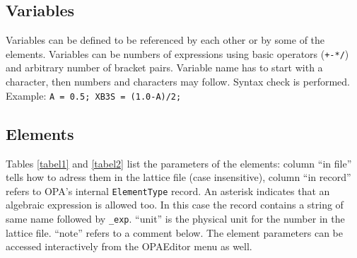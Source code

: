 \documentclass[12pt]{article}
\newcommand\code[1]{{\tt #1}}
\begin{document}
\subsection{\label{ssecvar}Variables}
Variables can be defined to be referenced by each other or by some of the elements.
Variables can be numbers of expressions using basic operators ({\tt +-*/}) and arbitrary number of bracket pairs. Variable name has to start with a character, then numbers and characters may follow. Syntax check is performed. Example: {\tt A = 0.5; XB3S = (1.0-A)/2; }\\

\subsection{\label{ssecelem}Elements}

Tables \ref{tabel1} and \ref{tabel2} list the parameters of the elements: column ``in file'' tells how to adress them in the lattice file (case insensitive), column ``in record'' refers to OPA's internal {\tt ElementType} record. 
An asterisk indicates that an algebraic expression is allowed too. In this case the record contains a string of same name followed by \code{\_exp}. ``unit'' is the physical unit for the number in the lattice file. ``note'' refers to a comment below.
The element parameters can be accessed interactively from the OPAEditor menu as well.
\end{document}
